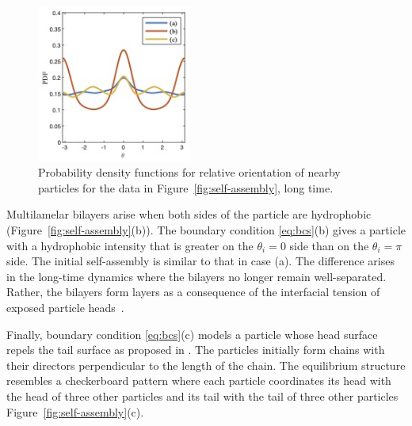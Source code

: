 \begin{figure}
  \vspace{-4pt}
  \centering
  \includegraphics[width=2in]{figures/OrderPDFs.jpg} 
  \vspace{-20pt}
  \caption{\footnotesize
    \label{fig:OrderPDFs}
    Probability density functions for
    relative orientation of nearby particles
    for the data in 
    Figure~\ref{fig:self-assembly}, long time.
  }
\end{figure}
Multilamelar bilayers arise when both sides of the particle
are hydrophobic (Figure~\ref{fig:self-assembly}(b)).
The boundary condition \eqref{eq:bcs}(b) 
gives a particle with a hydrophobic intensity that is greater
on the $\theta_i = 0$ side than on the $\theta_i = \pi$ side.
The initial self-assembly is similar to that in case (a).
The difference arises in the long-time dynamics where the bilayers
no longer remain well-separated. 
Rather, the bilayers form layers 
as a consequence of the interfacial tension of exposed particle
heads~\cite{Huetal19, deMeetal21}. 


Finally, boundary condition \eqref{eq:bcs}(c) models 
a particle whose head surface repels the tail surface as proposed in
\cite{MaRa76, Ma77}.
The particles initially form chains with their directors perpendicular to the
length of the chain. The equilibrium structure
resembles a checkerboard pattern
where each particle coordinates
its head with the head of three other particles and its tail with the
tail of three other particles Figure~\ref{fig:self-assembly}(c).



